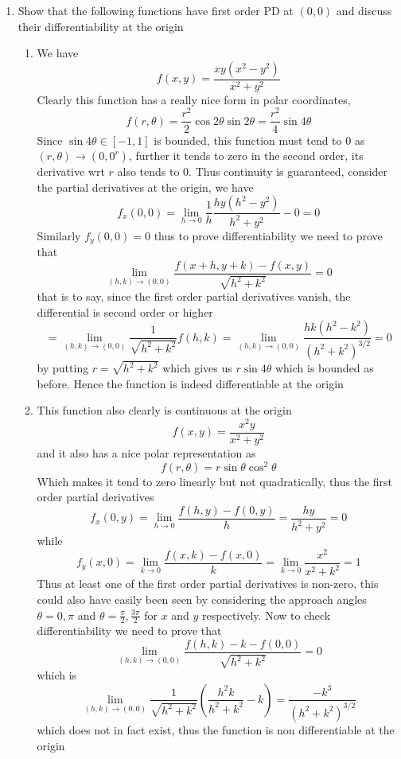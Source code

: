 \documentclass[12pt]{article}
\begin{document}
\begin{enumerate}
\item Show that the following functions have first order PD at $(0,0)$ and discuss their differentiability at the origin
\begin{enumerate}
\item
We have
$$
f(x,y) = \frac{xy(x^{2}-y^{2})}{x^{2} + y^{2}}
$$
Clearly this function has a really nice form in polar coordinates, 
$$
f(r, \theta) = \frac{r^{2}}{2} \cos 2\theta \sin 2\theta = \frac{r^{2}}{4} \sin 4\theta
$$
Since $\sin 4\theta \in[-1,1]$ is bounded, this function must tend to $0$ as $(r,\theta)\to (0, 0^{r})$, further it tends to zero in the second order, its derivative wrt $r$ also tends to $0$. Thus continuity is guaranteed, consider the partial derivatives at the origin, we have
$$
f_{x}(0,0) = \lim_{ h \to 0 } \frac{1}{h} \frac{hy(h^{2}-y^{2})}{h^{2} + y^{2}} -0 = 0
$$
Similarly $f_{y}(0,0) = 0$ thus to prove differentiability we need to prove that 
$$
\lim_{ (h,k) \to (0,0) } \frac{f(x + h, y + k) - f(x, y)}{\sqrt{ h^{2} + k^{2} }} = 0
$$
that is to say, since the first order partial derivatives vanish, the differential is second order or higher
$$
= \lim_{ (h,k) \to (0,0) } \frac{1}{\sqrt{ h^{2} + k^{2} }} f(h,k) = \lim_{ (h,k) \to (0,0) } \frac{hk(h^{2} -k^{2})}{(h^{2} + k^{2})^{3/2}} = 0
$$
by putting $r =  \sqrt{ h^{2} + k^{2} }$ which gives us $r \sin 4\theta$ which is bounded as before. Hence the function is indeed differentiable at the origin
\item
This function also clearly is continuous at the origin
$$
f(x,y) = \frac{x^{2}y}{x^{2} + y^{2}}
$$
and it also has a nice polar representation as
$$
f(r, \theta) = r \sin \theta \cos ^{2} \theta
$$
Which makes it tend to zero linearly but not quadratically, thus the first order partial derivatives
$$
f_{x}(0,y) = \lim_{ h \to 0 } \frac{f(h,y)-f(0,y)}{h}  = \frac{hy}{h^{2} + y^{2}} = 0
$$
while 
$$
f_{y}(x,0) = \lim_{ k \to 0 } \frac{f(x,k)-f(x,0)}{k} = \lim_{ k \to 0 } \frac{x^{2}}{x^{2} + k^{2}} = 1
$$
Thus at least one of the first order partial derivatives is non-zero, this could also have easily been seen by considering the approach angles $\theta = 0, \pi$ and $\theta = \frac{\pi}{2} , \frac{3\pi}{2}$ for $x$ and $y$ respectively. Now to check differentiability we need to prove that
$$
\lim_{ (h,k) \to (0,0) } \frac{f(h,k) - k - f(0,0)}{\sqrt{ h^{2} + k^{2} }} = 0
$$
which is
$$
\lim_{ (h,k) \to (0,0) } \frac{1}{\sqrt{ h^{2} + k^{2} }}\left( \frac{h^{2}k}{h^{2} + k^{2}}-k \right) = \frac{-k^{3}}{(h^{2} + k^{2})^{3/2}}
$$
which does not in fact exist, thus the function is non differentiable at the origin



\end{enumerate}
\end{enumerate}
\end{document}
